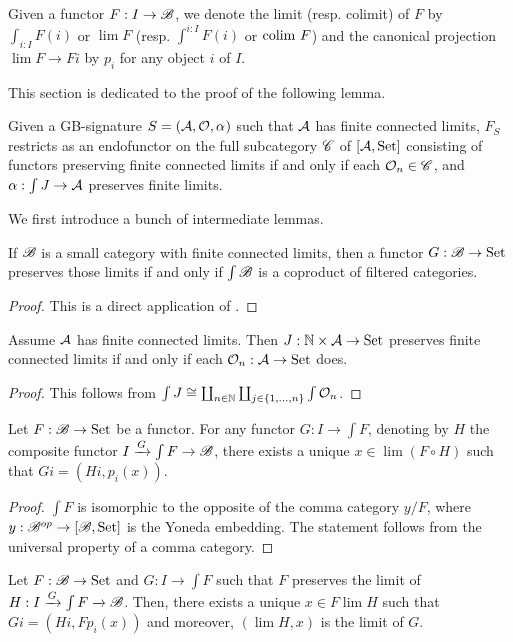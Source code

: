 \label{app:resF-direct}
\begin{notation}
Given a functor $F:I\rightarrow\B$, we denote the limit (resp. colimit)
of $F$ by $\int_{i:I}F(i)$ or $\lim F$ (resp. $\int^{i:I}F(i)$
or $\colim F$) and the canonical projection $\lim F\rightarrow Fi$
by $p_{i}$ for any object $i$ of $I$.
\end{notation}
This section is dedicated to the proof of the following lemma.
\begin{lemma}
\label{lem:F-restricts-simpl}Given a GB-signature $S=({\cal A},\indexedO,\ntharvecfunct)$
such that ${\cal A}$ has finite connected limits, $F_{S}$ restricts
as an endofunctor on the full subcategory $\C$ of $[{\cal A},\Set]$
consisting of functors preserving finite connected limits if and only
if each $\Oby n\in\C$, and $\alpha:\int J\rightarrow{\cal A}$ preserves
finite limits.
\end{lemma}
%
We first introduce a bunch of intermediate lemmas.
\begin{lemma}
\label{lem:coprod-filtered}If $\B$ is a small category with finite
connected limits, then a functor $G:\B\rightarrow\Set$ preserves
those limits if and only if $\int\B$ is a coproduct of filtered categories.
\end{lemma}
\begin{proof}
This is a direct application of \citet[Theorem 2.4 and Example 2.3.(iii)]{classificationaccessible}.
\end{proof}
\begin{corollary}
\label{cor:J-preserve}Assume ${\cal A}$ has finite connected limits.
Then $J:\mathbb{N}\times\mathcal{A}\rightarrow{\cal \Set}$ preserves
finite connected limits if and only if each $\Oby n:{\cal A\rightarrow\Set}$
does.
\end{corollary}
%
\begin{proof}
This follows from $\int J\cong\coprod_{n\in\mathbb{N}}\coprod_{j\in\{1,\dots,n\}}\int\Oby n$.
\end{proof}
\begin{lemma}
\label{lem:data-functor-elt}Let $F:\B\rightarrow\Set$ be a functor.
For any functor $G:I\rightarrow\int F$, denoting by $H$ the composite
functor $I\xrightarrow{G}\int F\rightarrow\B$, there exists a unique
$x\in\lim(F\circ H)$ such that $Gi=(Hi,p_{i}(x))$.
\end{lemma}
\begin{proof}
$\int F$ is isomorphic to the opposite of the comma category $y/F$,
where $y:\op{\B}\rightarrow[\B,\Set]$ is the Yoneda embedding. The
statement follows from the universal property of a comma category.
\end{proof}
\begin{lemma}
\label{lem:lim-elt}Let $F:\B\rightarrow\Set$ and $G:I\rightarrow\int F$
such that $F$ preserves the limit of $H:I\xrightarrow{G}\int F\xrightarrow{}\B$.
Then, there exists a unique $x\in F\lim H$ such that $Gi=(Hi,Fp_{i}(x))$
and moreover, $(\lim H,x)$ is the limit of $G$.
\end{lemma}


